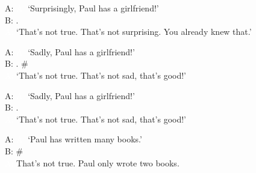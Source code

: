 \begin{exe}
\ex\label{ex:mirativitydgsnotatissueab}
A:   
\glt \textcolor{white}{A: }`Surprisingly, Paul has a girlfriend!' \\
\ex B: .   \\
\textcolor{white}{A: }`That's not true. That's not surprising. You already knew that.'

\end{exe}


\begin{exe}
\ex\label{ex:evaluationnotatissue}
A: 
\glt \textcolor{white}{A: }`Sadly, Paul has a girlfriend!'\label{ex:evaluationnotatissuea} \\
B: . \#  \\
\textcolor{white}{A: }`That's not true. That's not sad, that's good!'
\end{exe}

\begin{exe}
\ex\label{ex:evaluationnotatissueb}
A: 
\glt \textcolor{white}{A: }`Sadly, Paul has a girlfriend!' \\
B: .    \\
\textcolor{white}{A: }`That's not true. That's not sad, that's good!'
\end{exe}


\begin{exe}
\ex A:  
\glt \textcolor{white}{A: }`Paul has written many books.' \\
B:  \#\\
%
\textcolor{white}{A: }That's not true. Paul only wrote two books.

\label{bsp:evaluationmuchlittlebnotatissuea}

\end{exe}

